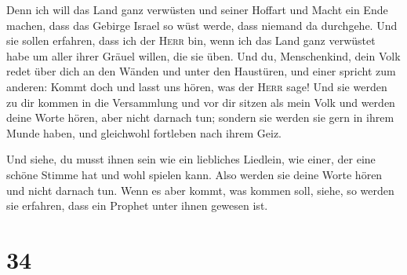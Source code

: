  Denn ich will das Land ganz verwüsten und seiner Hoffart
und Macht ein Ende machen, dass das Gebirge Israel so wüst werde, dass
niemand da durchgehe.  Und sie sollen erfahren, dass ich
der \textsc{Herr} bin, wenn ich das Land ganz verwüstet habe um aller
ihrer Gräuel willen, die sie üben.  Und du, Menschenkind,
dein Volk redet über dich an den Wänden und unter den Haustüren, und
einer spricht zum anderen: Kommt doch und lasst uns hören, was der
\textsc{Herr} sage!  Und sie werden zu dir kommen in die
Versammlung und vor dir sitzen als mein Volk und werden deine Worte
hören, aber nicht darnach tun; sondern sie werden sie gern in ihrem
Munde haben, und gleichwohl fortleben nach ihrem Geiz.

 Und siehe, du musst ihnen sein wie ein liebliches
Liedlein, wie einer, der eine schöne Stimme hat und wohl spielen kann.
Also werden sie deine Worte hören und nicht darnach tun. 
Wenn es aber kommt, was kommen soll, siehe, so werden sie erfahren, dass
ein Prophet unter ihnen gewesen ist.

\hypertarget{section-33}{%
\section{34}\label{section-33}}


